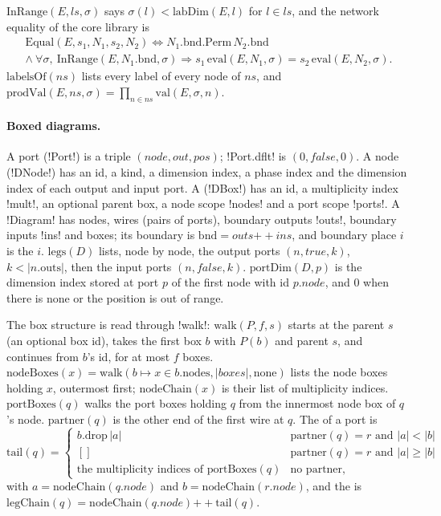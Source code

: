 $\mathrm{InRange}(E,ls,\sigma)$ says $\sigma(l)<\mathrm{labDim}(E,l)$ for $l\in ls$, and the network equality of the core library is
\begin{multline*}
\mathrm{Equal}(E,s_1,N_1,s_2,N_2)\iff N_1.\mathrm{bnd}.\mathrm{Perm}\,N_2.\mathrm{bnd}\\ \land\ \forall\sigma,\ \mathrm{InRange}(E,N_1.\mathrm{bnd},\sigma)\Rightarrow s_1\,\mathrm{eval}(E,N_1,\sigma)=s_2\,\mathrm{eval}(E,N_2,\sigma).
\end{multline*}
$\mathrm{labelsOf}(ns)$ lists every label of every node of $ns$, and $\mathrm{prodVal}(E,ns,\sigma)=\prod_{n\in ns}\mathrm{val}(E,\sigma,n)$.

\paragraph{Boxed diagrams.} A port (\lean!Port!) is a triple $(\mathit{node},\mathit{out},\mathit{pos})$; \lean!Port.dflt! is $(0,\mathit{false},0)$. A node (\lean!DNode!) has an id, a kind, a dimension index, a phase index and the dimension index of each output and input port. A \bbox{} (\lean!DBox!) has an id, a multiplicity index \lean!mult!, an optional parent box, a node scope \lean!nodes! and a port scope \lean!ports!. A \lean!Diagram! has nodes, wires (pairs of ports), boundary outputs \lean!outs!, boundary inputs \lean!ins! and boxes; its boundary is $\mathrm{bnd}=\mathit{outs}\mathbin{+\!\!+}\mathit{ins}$, and boundary place $i$ is the  $i$. $\mathrm{legs}(D)$ lists, node by node, the output ports $(n,\mathit{true},k)$, $k<|n.\mathrm{outs}|$, then the input ports $(n,\mathit{false},k)$. $\mathrm{portDim}(D,p)$ is the dimension index stored at port $p$ of the first node with id $p.\mathit{node}$, and $0$ when there is none or the position is out of range.

The box structure is read through \lean!walk!: $\mathrm{walk}(P,f,s)$ starts at the parent $s$ (an optional box id), takes the first box $b$ with $P(b)$ and parent $s$, and continues from $b$'s id, for at most $f$ boxes. $\mathrm{nodeBoxes}(x)=\mathrm{walk}(b\mapsto x\in b.\mathrm{nodes},|\mathit{boxes}|,\mathrm{none})$ lists the node boxes holding $x$, outermost first; $\mathrm{nodeChain}(x)$ is their list of multiplicity indices. $\mathrm{portBoxes}(q)$ walks the port boxes holding $q$ from the innermost node box of $q$'s node. $\mathrm{partner}(q)$ is the other end of the first wire at $q$. The  of a port is
\[
\mathrm{tail}(q)=\begin{cases}b.\mathrm{drop}\,|a| & \mathrm{partner}(q)=r\text{ and }|a|<|b|\\ [] & \mathrm{partner}(q)=r\text{ and }|a|\ge|b|\\ \text{the multiplicity indices of }\mathrm{portBoxes}(q) & \text{no partner,}\end{cases}
\]
with $a=\mathrm{nodeChain}(q.\mathit{node})$ and $b=\mathrm{nodeChain}(r.\mathit{node})$,
and the  is $\mathrm{legChain}(q)=\mathrm{nodeChain}(q.\mathit{node})\mathbin{+\!\!+}\mathrm{tail}(q)$.


